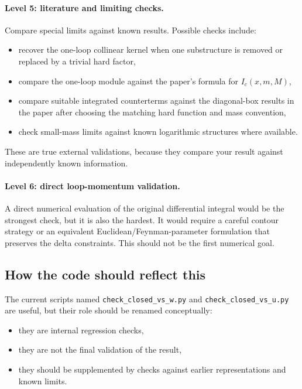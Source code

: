 \documentclass[11pt,a4paper]{article}
\begin{document}
\paragraph{Level 5: literature and limiting checks.}
Compare special limits against known results. Possible checks include:
\begin{itemize}
  \item recover the one-loop collinear kernel when one substructure is removed or replaced by a trivial hard factor,
  \item compare the one-loop module against the paper's formula for \(I_c(x,m,M)\),
  \item compare suitable integrated counterterms against the diagonal-box results in the paper after choosing the matching hard function and mass convention,
  \item check small-mass limits against known logarithmic structures where available.
\end{itemize}

These are true external validations, because they compare your result against independently known information.

\paragraph{Level 6: direct loop-momentum validation.}
A direct numerical evaluation of the original differential integral would be the strongest check, but it is also the hardest. It would require a careful contour strategy or an equivalent Euclidean/Feynman-parameter formulation that preserves the delta constraints. This should not be the first numerical goal.

\subsection{How the code should reflect this}

The current scripts named \texttt{check\_closed\_vs\_w.py} and \texttt{check\_closed\_vs\_u.py} are useful, but their role should be renamed conceptually:
\begin{itemize}
  \item they are internal regression checks,
  \item they are not the final validation of the result,
  \item they should be supplemented by checks against earlier representations and known limits.
\end{itemize}
\end{document}
